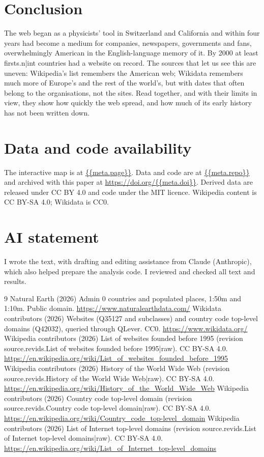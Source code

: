 \documentclass[11pt,a4paper]{article}
\begin{document}
\section{Conclusion}
The web began as a physicists' tool in Switzerland and California and within four years had become a medium for companies, newspapers, governments and fans, overwhelmingly American in the English-language memory of it. By 2000 at least {{firsts.n|int}} countries had a website on record. The sources that let us see this are uneven: Wikipedia's list remembers the American web; Wikidata remembers much more of Europe's and the rest of the world's, but with dates that often belong to the organisations, not the sites. Read together, and with their limits in view, they show how quickly the web spread, and how much of its early history has not been written down.

\section*{Data and code availability}
The interactive map is at \url{{{meta.page}}}. Data and code are at \url{{{meta.repo}}} and archived with this paper at \url{https://doi.org/{{meta.doi}}}. Derived data are released under CC BY 4.0 and code under the MIT licence. Wikipedia content is CC BY-SA 4.0; Wikidata is CC0.

\section*{AI statement}
I wrote the text, with drafting and editing assistance from Claude (Anthropic), which also helped prepare the analysis code. I reviewed and checked all text and results.

\begin{thebibliography}{9}
 Natural Earth (2026) Admin 0 countries and populated places, 1:50m and 1:10m. Public domain. \url{https://www.naturalearthdata.com/}
 Wikidata contributors (2026) Websites (Q35127 and subclasses) and country code top-level domains (Q42032), queried through QLever. CC0. \url{https://www.wikidata.org/}
 Wikipedia contributors (2026) List of websites founded before 1995 (revision {{source.revids.List of websites founded before 1995|raw}}). CC BY-SA 4.0. \url{https://en.wikipedia.org/wiki/List_of_websites_founded_before_1995}
 Wikipedia contributors (2026) History of the World Wide Web (revision {{source.revids.History of the World Wide Web|raw}}). CC BY-SA 4.0. \url{https://en.wikipedia.org/wiki/History_of_the_World_Wide_Web}
 Wikipedia contributors (2026) Country code top-level domain (revision {{source.revids.Country code top-level domain|raw}}). CC BY-SA 4.0. \url{https://en.wikipedia.org/wiki/Country_code_top-level_domain}
 Wikipedia contributors (2026) List of Internet top-level domains (revision {{source.revids.List of Internet top-level domains|raw}}). CC BY-SA 4.0. \url{https://en.wikipedia.org/wiki/List_of_Internet_top-level_domains}
\end{thebibliography}
\end{document}
